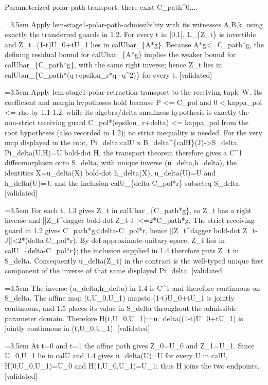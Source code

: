 \documentclass{article}
\newcommand{\step}[1]{\par\noindent\hangindent=3.5em\hangafter=1%
  \makebox[3.5em][l]{\textbf{#1.}}}
\newcommand{\steptag}[1]{\hfill{\small\textsf{[#1]}}}
\begin{document}
\begin{proofbox}{Parameterized polar-path transport: there exist C\_path\textasciicircum{}0,...}
\step{1.3} Apply lem-stage1-polar-path-admissibility with its witnesses A,B,k, using exactly the transferred guards in 1.2. For every t in [0,1], L\_\{Z\_t\} is invertible and Z\_t=(1-t)U\_0+tU\_1 lies in calUbar\_\{A*g\}. Because A*g<=C\_path*g, the defining residual bound for calUbar\_\{A*g\} implies the weaker bound for calUbar\_\{C\_path*g\}, with the same right inverse; hence Z\_t lies in calUbar\_\{C\_path*(q+epsilon\_r*q+q\textasciicircum{}2)\} for every t. \steptag{validated} \\[4pt]
\step{1.4} Apply lem-stage1-polar-retraction-transport to the receiving tuple W. Its coefficient and margin hypotheses hold because P <= C\_pol and 0 < kappa\_pol <= rho by 1.1-1.2, while its algebra/delta smallness hypothesis is exactly the non-strict receiving guard C\_pol*(epsilon\_r+delta) <= kappa\_pol from the root hypotheses (also recorded in 1.2); no strict inequality is needed. For the very map displayed in the root, Pi\_delta:calU x B\_delta\textasciicircum{}\{calH\}(J)->S\_delta, Pi\_delta(U,H)=U bold-dot H, the transport theorem therefore gives a C\textasciicircum{}1 diffeomorphism onto S\_delta, with unique inverse (u\_delta,h\_delta), the identities X=u\_delta(X) bold-dot h\_delta(X), u\_delta(U)=U and h\_delta(U)=J, and the inclusion calU\_\{delta-C\_pol*r\} subseteq S\_delta. \steptag{validated} \\[4pt]
\step{1.5} For each t, 1.3 gives Z\_t in calUbar\_\{C\_path*g\}, so Z\_t has a right inverse and ||Z\_t\textasciicircum{}dagger bold-dot Z\_t-J||<=2*C\_path*g. The strict receiving guard in 1.2 gives C\_path*g<delta-C\_pol*r, hence ||Z\_t\textasciicircum{}dagger bold-dot Z\_t-J||<2*(delta-C\_pol*r). By def-approximate-unitary-space, Z\_t lies in calU\_\{delta-C\_pol*r\}; the inclusion supplied in 1.4 therefore puts Z\_t in S\_delta. Consequently u\_delta(Z\_t) in the contract is the well-typed unique first component of the inverse of that same displayed Pi\_delta. \steptag{validated} \\[4pt]
\step{1.6} The inverse (u\_delta,h\_delta) in 1.4 is C\textasciicircum{}1 and therefore continuous on S\_delta. The affine map (t,U\_0,U\_1) mapsto (1-t)U\_0+tU\_1 is jointly continuous, and 1.5 places its value in S\_delta throughout the admissible parameter domain. Therefore H(t,U\_0,U\_1):=u\_delta((1-t)U\_0+tU\_1) is jointly continuous in (t,U\_0,U\_1). \steptag{validated} \\[4pt]
\step{1.7} At t=0 and t=1 the affine path gives Z\_0=U\_0 and Z\_1=U\_1. Since U\_0,U\_1 lie in calU and 1.4 gives u\_delta(U)=U for every U in calU, H(0,U\_0,U\_1)=U\_0 and H(1,U\_0,U\_1)=U\_1; thus H joins the two endpoints. \steptag{validated} \\[4pt]

\end{proofbox}
\end{document}
